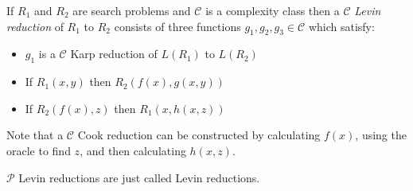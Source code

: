\documentclass[12pt]{article}
\begin{document}
If $R_1$ and $R_2$ are search problems and $\mathcal{C}$ is a complexity class then a $\mathcal{C}$ \emph{Levin reduction} of $R_1$ to $R_2$ consists of three functions $g_1, g_2, g_3\in\mathcal{C}$ which satisfy:

\begin{itemize}
\item $g_1$ is a $\mathcal{C}$ Karp reduction of $L(R_1)$ to $L(R_2)$

\item If $R_1(x,y)$ then $R_2(f(x),g(x,y))$

\item If $R_2(f(x),z)$ then $R_1(x,h(x,z))$
\end{itemize}

Note that a $\mathcal{C}$ Cook reduction can be constructed by calculating $f(x)$, using the oracle to find $z$, and then calculating $h(x,z)$.

$\mathcal{P}$ Levin reductions are just called Levin reductions.
\end{document}
